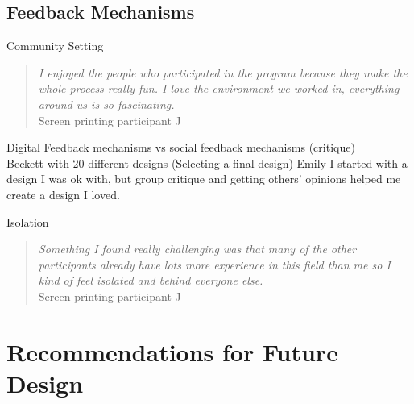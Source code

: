 \documentclass{sigchi}
\begin{document}
\subsection{Feedback Mechanisms}
Community Setting\\
 \begin{quotation}
\textit{I enjoyed the people who participated in the program because they make the whole process really fun. I love the environment we worked in, everything around us is so fascinating.}
\\Screen printing participant J
\end{quotation}

Digital Feedback mechanisms vs social feedback mechanisms (critique)\\
Beckett with 20 different designs (Selecting a final design)
Emily I started with a design I was ok with, but group critique and getting others' opinions helped me create a design I loved.

Isolation\\
 \begin{quotation}
\textit{Something I found really challenging was that many of the other participants already have lots more experience in this field than me so I kind of feel isolated and behind everyone else.}
\\Screen printing participant J
\end{quotation}


\section{Recommendations for Future Design}
\end{document}
